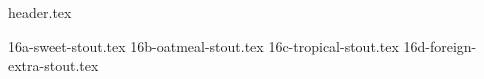\clearpage
{}
\divisorLine
{header.tex}
\begin{multicols}{2}
{16a-sweet-stout.tex}
{16b-oatmeal-stout.tex}
{16c-tropical-stout.tex}
{16d-foreign-extra-stout.tex}
\end{multicols}